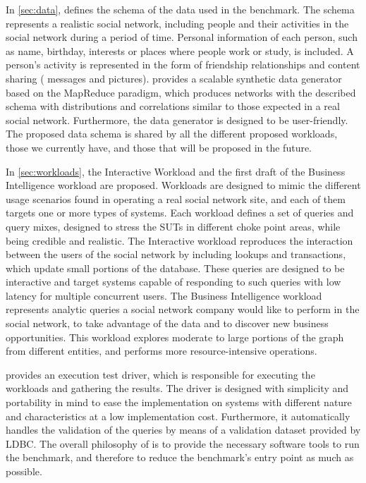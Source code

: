 In \autoref{sec:data}, \ldbcsnb defines the schema of the data used in
the benchmark. The schema represents a realistic social network, including
people and their activities in the social network during a period of time.
Personal information of each person, such as name, birthday, interests
or places where people work or study, is included. A person's activity is
represented in the form of friendship relationships and content sharing (\ie
messages and pictures). \ldbcsnb provides a scalable synthetic data generator
based on the MapReduce paradigm, which produces networks with the
described schema with distributions and correlations similar to those expected
in a real social network. Furthermore, the data generator is designed to be
user-friendly. The proposed data schema is shared by all the different proposed
workloads, those we currently have, and those that will be proposed in the future.

In \autoref{sec:workloads}, the Interactive Workload and the first draft of
the Business Intelligence workload are proposed. Workloads are designed to mimic
the different usage scenarios found in operating a real social network site, and
each of them targets one or more types of systems.  Each workload defines a set
of queries and query mixes, designed to stress the SUTs in different choke point
areas, while being credible and realistic. The Interactive workload reproduces the
interaction between the users of the social network by including lookups and
transactions, which update small portions of the database. These queries are
designed to be interactive and target systems capable of responding to such queries
with low latency for multiple concurrent users. The Business Intelligence workload
represents analytic queries a social network company would
like to perform in the social network, to take advantage of the data and to
discover new business opportunities. This workload explores moderate to large
portions of the graph from different entities, and performs more resource-intensive
operations.

\ldbcsnb provides an execution test driver, which is responsible for executing
the workloads and gathering the results. The driver is designed with simplicity
and portability in mind to ease the implementation on systems with different
nature and characteristics at a low implementation cost. Furthermore, it
automatically handles the validation of the queries by means of a validation
dataset provided by LDBC.  The overall philosophy of \ldbcsnb is to provide
the necessary software tools to run the benchmark, and therefore to reduce the
benchmark's entry point as much as possible.

